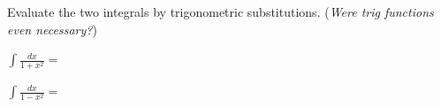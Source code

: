 Evaluate the two integrals by trigonometric substitutions.  (\emph{Were trig functions even necessary?})

\bigskip \noindent $\displaystyle \int \frac{dx}{1+x^2} =$

\vspace{40mm}

\medskip \noindent $\displaystyle \int \frac{dx}{1-x^2} =$

\vfill
